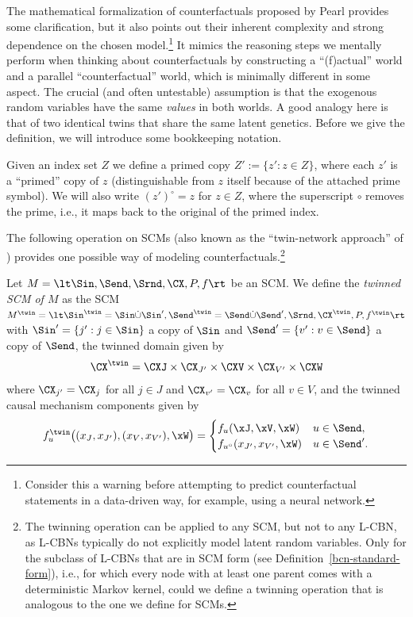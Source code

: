 The mathematical formalization of counterfactuals proposed by Pearl provides some clarification, but it also points out their 
inherent complexity and strong dependence on the chosen model.\footnote{Consider this a warning before attempting to 
predict counterfactual statements in a data-driven way, for example, using a neural network.}
It mimics the reasoning steps we mentally perform when thinking about counterfactuals by constructing a ``(f)actual''
world and a parallel ``counterfactual'' world, which is minimally different in some aspect.
The crucial (and often untestable) assumption is that the exogenous random variables have the same \emph{values} in both worlds.
A good analogy here is that of two identical twins that share the same latent genetics. 
Before we give the definition, we will introduce some bookkeeping notation.
\begin{Not}
  Given an index set $Z$ we define a primed copy $Z' := \{z' : z \in Z\}$, where each $z'$ is a ``primed'' copy of $z$ 
  (distinguishable from $z$ itself because of the attached prime symbol). 
  We will also write $(z')^\circ = z$ for $z \in Z$, where the superscript $\circ$ removes the prime, i.e., it
  maps back to the original of the primed index.
\end{Not}
The following operation on SCMs (also known as the ``twin-network approach'' of \cite{BalkePearl1994a}) provides one possible way of modeling counterfactuals.\footnote{The twinning operation can be applied to any SCM, but not to any L-CBN, as L-CBNs typically do not explicitly model latent random variables. Only for the subclass of L-CBNs that are in SCM form (see Definition~\ref{bcn-standard-form}), i.e., for which every node with at least one parent comes with a deterministic Markov kernel, could we define a twinning operation that is analogous to the one we define for SCMs.}
\begin{Def}\label{def:twin_scm}
  Let $M = \lt \Sin, \Send, \Srnd, \CX, P, f \rt$ be an SCM. We define the \emph{twinned SCM of $M$} as
  the SCM $M^\twin = \lt \Sin^\twin = \Sin \dot\cup \Sin', \Send^\twin = \Send \dot\cup \Send', \Srnd, \CX^\twin, P, f^\twin \rt$
  with $\Sin' = \{j' : j \in \Sin\}$ a copy of $\Sin$ and
  $\Send' = \{v' : v \in \Send\}$ a copy of $\Send$, the twinned domain given by
  $$\CX^\twin = \CXJ \times \CX_{J'} \times \CXV \times \CX_{V'} \times \CXW$$
  where $\CX_{j'} = \CX_j$ for all $j \in J$ and $\CX_{v'} = \CX_v$ for all $v \in V$,
  and the twinned causal mechanism components given by
  $$f^\twin_u\big((x_J,x_{J'}),(x_V,x_{V'}),\xW\big) = 
  \begin{cases}
    f_u(\xJ,\xV,\xW) & u \in \Send,  \\
    f_{u^\circ}(x_{J'},x_{V'},\xW) & u \in \Send'.
  \end{cases}$$
\end{Def}
